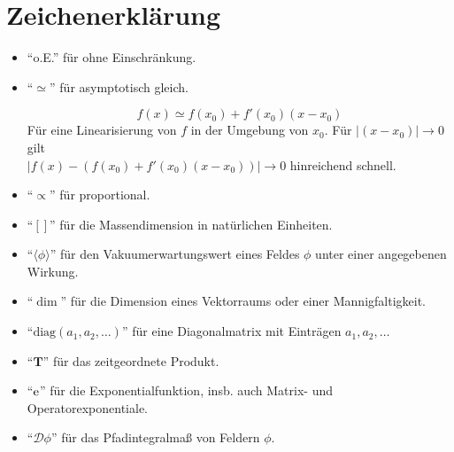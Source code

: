 \clearpage
\section*{Zeichenerklärung}

\begin{itemize}
\item "`o.E."' für ohne Einschränkung.

\item "`$\simeq$"' für asymptotisch gleich.
	\begin{beispiel}
	 \begin{equation}
	  f(x)\simeq f(x_0)+f'(x_0)(x-x_0)
	 \end{equation}
	  Für eine Linearisierung von $f$ in der Umgebung von $x_0$. Für 
	  $
	  \left|(x-x_0)\right|\rightarrow 0
	  $
	  gilt \\ 
	  $
	  \left|f(x)-\left(f(x_0)+f'(x_0)(x-x_0)\right)\right|\rightarrow 0 
	  $
	  hinreichend schnell.
	\end{beispiel}

  \item "`$\propto$"' für proportional.
	
	
  \item "`$[]$"' für die Massendimension in natürlichen Einheiten.
  
  \item "`$\Big\langle \phi \Big\rangle$"' für den Vakuumerwartungswert eines Feldes $\phi$ 
	  unter einer angegebenen Wirkung.
  
  \item "`$\dim$"' für die Dimension eines Vektorraums oder einer Mannigfaltigkeit.

	
  \item "`$\text{diag}(a_1,a_2,\ldots)$"' für eine Diagonalmatrix mit Einträgen $a_1,a_2,\ldots$


  \item "`$\textbf{T}$"' für das zeitgeordnete Produkt.
  
  \item "`$\text{e}$"' für die Exponentialfunktion, insb. auch Matrix- und Operatorexponentiale.
  
  \item "`$\mathcal{D}\phi$"' für das Pfadintegralmaß von Feldern $\phi$.
      
 
 
\end{itemize}
